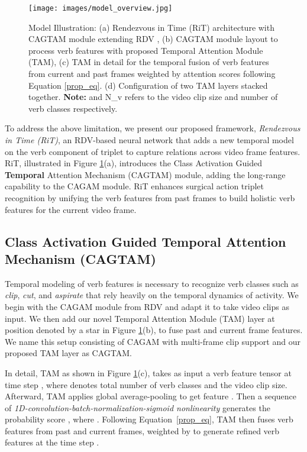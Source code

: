 \documentclass{article}
\begin{document}
\begin{figure}[t!]
    \centering
    \texttt{[image: images/model\_overview.jpg]}
    \caption{Model Illustration: (a) Rendezvous in Time (RiT) architecture with CAGTAM module extending RDV \cite{rdv}, (b) CAGTAM module layout to process verb features with proposed Temporal Attention Module (TAM), (c) TAM in detail for the temporal fusion of verb features from current and past frames weighted by attention scores following Equation \ref{prop_eq}. (d) Configuration of two TAM layers stacked together. \textbf{Note:}  and N\_v refers to the video clip size and number of verb classes respectively.}
    \label{proposed_method}
\end{figure}

To address the above limitation, we present our proposed framework, \textit{Rendezvous in Time (RiT)}, an RDV-based neural network that adds a new temporal model on the verb component of triplet to capture relations across video frame features. RiT, illustrated in Figure \ref{proposed_method}(a), introduces the Class Activation Guided \textbf{Temporal} Attention Mechanism (CAGTAM) module, adding the long-range capability to the CAGAM module. RiT enhances surgical action triplet recognition by unifying the verb features from past frames to build holistic verb features for the current video frame. 

\subsection{Class Activation Guided Temporal Attention Mechanism (CAGTAM)}
Temporal modeling of verb features is necessary to recognize verb classes such as \textit{clip}, \textit{cut}, and \textit{aspirate} that rely heavily on the temporal dynamics of activity. We begin with the CAGAM module from RDV \cite{rdv} and adapt it to take video clips as input. We then add our novel Temporal Attention Module (TAM) layer at position  denoted by a star in Figure \ref{proposed_method}(b), to fuse past and current frame features. We name this setup consisting of CAGAM with multi-frame clip support and our proposed TAM layer as CAGTAM.

In detail, TAM as shown in Figure \ref{proposed_method}(c),  takes as input a verb feature tensor  at time step , where  denotes total number of verb classes and  the video clip size.
Afterward, TAM applies global average-pooling to get feature . Then a sequence of \textit{1D-convolution-batch-normalization-sigmoid nonlinearity} generates the probability score , where . Following Equation~\ref{prop_eq}, TAM then fuses verb features from past and current frames, weighted by  to generate refined verb features  at the time step .
\end{document}
